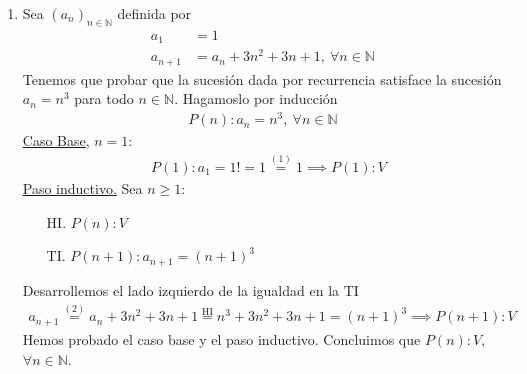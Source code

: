 \begin{enumerate}[label=\roman*)]
    \item Sea $(a_n)_{n \in \mathbb{N}}$ definida por
    \setcounter{equation}{0}
    \begin{align}
        a_1 &= 1 \\
        a_{n+1} &= a_n + 3n^2 + 3n + 1,\ \forall n \in \mathbb{N}
    \end{align} 
    Tenemos que probar que la sucesión dada por recurrencia satisface la sucesión $a_n = n^3$ para todo $n \in 
    \mathbb{N}$. 
    Hagamoslo por inducción
    \begin{align*}
        P(n): a_n = n^3,\ \forall n \in \mathbb{N}
    \end{align*}
    \underline{Caso Base}, $n = 1$:
	    \begin{align*}
		    &P(1): a_1 = 1! = 1 \overset{(1)}{=} 1 \implies P(1):V
	    \end{align*}
	\underline{Paso inductivo.} Sea $n \geq 1$:
	\begin{enumerate}
        \item[HI.] $P(n): V$
        \item[TI.] $P(n+1): a_{n+1} = (n+1)^3$
    \end{enumerate}
 	Desarrollemos el lado izquierdo de la igualdad en la TI
    \begin{align*}
  	    a_{n+1} \overset{(2)}{=} a_n + 3n^2 + 3n + 1 \overset{\text{HI}}{=} n^3 + 3n^2 + 3n + 1 = (n+1)^3 
        \implies P(n+1):V
    \end{align*}
    Hemos probado el caso base y el paso inductivo. Concluimos que $P(n):V,$ $\forall n \in \mathbb{N}$. \\


\end{enumerate}
